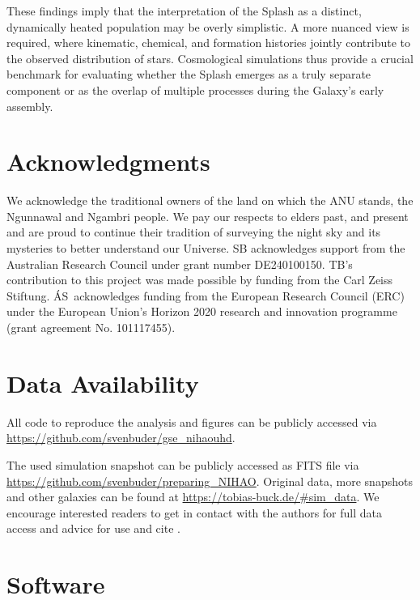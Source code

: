 \documentclass[fleqn,usenatbib]{mnras}
\begin{document}
These findings imply that the interpretation of the Splash as a distinct, dynamically heated population may be overly simplistic. A more nuanced view is required, where kinematic, chemical, and formation histories jointly contribute to the observed distribution of stars. Cosmological simulations thus provide a crucial benchmark for evaluating whether the Splash emerges as a truly separate component or as the overlap of multiple processes during the Galaxy’s early assembly.

\section*{Acknowledgments}

We acknowledge the traditional owners of the land on which the ANU stands, the Ngunnawal and Ngambri people. We pay our respects to elders past, and present and are proud to continue their tradition of surveying the night sky and its mysteries to better understand our Universe. SB acknowledges support from the Australian Research Council under grant number DE240100150.
TB's contribution to this project was made possible by funding from the Carl Zeiss Stiftung. \'{A}S~acknowledges funding from the European Research Council (ERC) under the European Union’s Horizon 2020 research and innovation programme (grant agreement No. 101117455).

\section*{Data Availability}

All code to reproduce the analysis and figures can be publicly accessed via \url{https://github.com/svenbuder/gse_nihaouhd}.

The used simulation snapshot can be publicly accessed as FITS file via \url{https://github.com/svenbuder/preparing_NIHAO}. Original data, more snapshots and other galaxies can be found at \url{https://tobias-buck.de/#sim_data}. We encourage interested readers to get in contact with the authors for full data access and advice for use and cite \citet{Buck2020b, Buck2021}.

\section*{Software}
\end{document}
